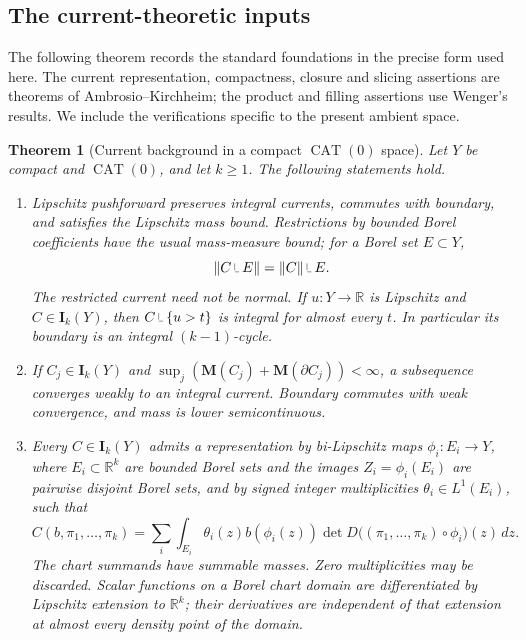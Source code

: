 \documentclass[11pt]{article}
\numberwithin{equation}{section}
\newtheorem{theorem}{Theorem}[section]
\theoremstyle{definition}
\theoremstyle{remark}
\begin{document}
\subsection{The current-theoretic inputs}

The following theorem records the standard foundations in the precise
form used here. The current representation, compactness, closure and
slicing assertions are theorems of Ambrosio--Kirchheim; the product and
filling assertions use Wenger's results. We include the verifications
specific to the present ambient space.

\begin{theorem}[Current background in a compact \(\operatorname{CAT}(0)\) space]
\label{thm:current-background}
Let \(Y\) be compact and \(\operatorname{CAT}(0)\), and let \(k\ge1\).
The following statements hold.
\begin{enumerate}[label=\textup{(\roman*)}]
\item Lipschitz pushforward preserves integral currents, commutes with
boundary, and satisfies the Lipschitz mass bound. Restrictions by bounded
Borel coefficients have the usual mass-measure bound; for a Borel set
\(E\subset Y\),
\[
 \|C\mathbin{\vrule height 1.4ex depth -0.3ex width .07ex\vrule height .07ex depth 0ex width .7ex} E\|=\|C\|\mathbin{\vrule height 1.4ex depth -0.3ex width .07ex\vrule height .07ex depth 0ex width .7ex} E.
\]
The restricted current need not be normal. If \(u:Y\to\mathbb R\)
is Lipschitz and \(C\in\mathbf I_k(Y)\), then
\(C\mathbin{\vrule height 1.4ex depth -0.3ex width .07ex\vrule height .07ex depth 0ex width .7ex}\{u>t\}\) is integral for almost every \(t\).
In particular its boundary is an integral \((k-1)\)-cycle.

\item If \(C_j\in\mathbf I_k(Y)\) and
\(\sup_j(\mathbf M(C_j)+\mathbf M(\partial C_j))<\infty\), a subsequence converges
weakly to an integral current. Boundary commutes with weak convergence,
and mass is lower semicontinuous.

\item Every \(C\in\mathbf I_k(Y)\) admits a representation by bi-Lipschitz
maps \(\phi_i:E_i\to Y\), where \(E_i\subset\mathbb R^k\) are bounded Borel
sets and the images \(Z_i=\phi_i(E_i)\) are pairwise disjoint Borel sets,
and by signed integer multiplicities \(\theta_i\in L^1(E_i)\), such that
\begin{equation}
\label{eq:chart-action}
 C(b,\pi_1,\ldots,\pi_k)
 =\sum_i\int_{E_i}\theta_i(z)b(\phi_i(z))
       \det D\bigl((\pi_1,\ldots,\pi_k)\circ\phi_i\bigr)(z)\,d z.
\end{equation}
The chart summands have summable masses. Zero multiplicities may be
discarded. Scalar functions on a Borel chart domain are differentiated
by Lipschitz extension to \(\mathbb R^k\); their derivatives are independent
of that extension at almost every density point of the domain.


\end{enumerate}
\end{theorem}
\end{document}
